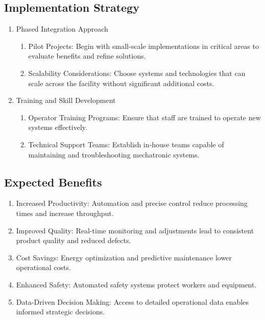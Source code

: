 \subsection{Implementation Strategy}
\begin{enumerate}
    \item Phased Integration Approach
    \begin{enumerate}
        \item Pilot Projects: Begin with small-scale implementations in critical areas to evaluate benefits and refine solutions.
        \item Scalability Considerations: Choose systems and technologies that can scale across the facility without significant additional costs.
    \end{enumerate}
    \item Training and Skill Development
    \begin{enumerate}
        \item Operator Training Programs: Ensure that staff are trained to operate new systems effectively.
        \item Technical Support Teams: Establish in-house teams capable of maintaining and troubleshooting mechatronic systems.
    \end{enumerate}
\end{enumerate}

\subsection{Expected Benefits}
\begin{enumerate}
    \item Increased Productivity: Automation and precise control reduce processing times and increase throughput.
    \item Improved Quality: Real-time monitoring and adjustments lead to consistent product quality and reduced defects.
    \item Cost Savings: Energy optimization and predictive maintenance lower operational costs.
    \item Enhanced Safety: Automated safety systems protect workers and equipment.
    \item Data-Driven Decision Making: Access to detailed operational data enables informed strategic decisions.
\end{enumerate}
